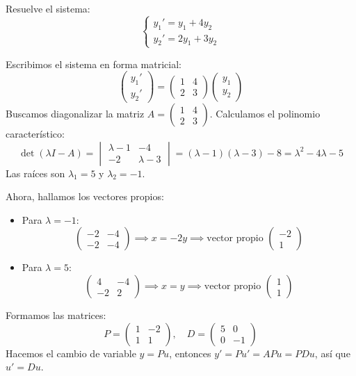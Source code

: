\begin{example}
Resuelve el sistema:
\[
\begin{cases}
y_1' = y_1 + 4y_2 \\
y_2' = 2y_1 + 3y_2
\end{cases}
\]
\begin{myproof}
Escribimos el sistema en forma matricial:
\[
\begin{pmatrix}
y_1' \\ y_2'
\end{pmatrix}
=
\begin{pmatrix}
1 & 4 \\
2 & 3
\end{pmatrix}
\begin{pmatrix}
y_1 \\ y_2
\end{pmatrix}
\]
Buscamos diagonalizar la matriz $A = \begin{pmatrix} 1 & 4 \\ 2 & 3 \end{pmatrix}$. Calculamos el polinomio característico:
\[
\det(\lambda I - A) = 
\begin{vmatrix}
\lambda - 1 & -4 \\
-2 & \lambda - 3
\end{vmatrix}
= (\lambda - 1)(\lambda - 3) - 8 = \lambda^2 - 4\lambda - 5
\]
Las raíces son $\lambda_1 = 5$ y $\lambda_2 = -1$.

Ahora, hallamos los vectores propios:
\begin{itemize}
    \item Para $\lambda = -1$:
    \[
    \begin{pmatrix}
    -2 & -4 \\
    -2 & -4
    \end{pmatrix}
    \implies x = -2y \implies \text{vector propio } \begin{pmatrix} -2 \\ 1 \end{pmatrix}
    \]
    \item Para $\lambda = 5$:
    \[
    \begin{pmatrix}
    4 & -4 \\
    -2 & 2
    \end{pmatrix}
    \implies x = y \implies \text{vector propio } \begin{pmatrix} 1 \\ 1 \end{pmatrix}
    \]
\end{itemize}
Formamos las matrices:
\[
P = \begin{pmatrix} 1 & -2 \\ 1 & 1 \end{pmatrix}, \quad D = \begin{pmatrix} 5 & 0 \\ 0 & -1 \end{pmatrix}
\]
Hacemos el cambio de variable $y = Pu$, entonces $y' = Pu' = APu = P D u$, así que $u' = D u$.


\end{myproof}
\end{example}
